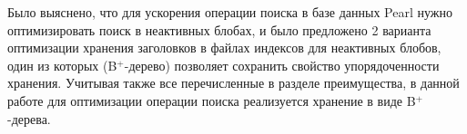 Было выяснено, что для ускорения операции поиска в базе данных Pearl нужно оптимизировать поиск в неактивных блобах, и было предложено 2 варианта оптимизации хранения заголовков в файлах индексов для неактивных блобов, один из которых (B$^+$-дерево) позволяет сохранить свойство упорядоченности хранения. Учитывая также все перечисленные в разделе преимущества, в данной работе для оптимизации операции поиска реализуется хранение в виде B$^+$-дерева.
